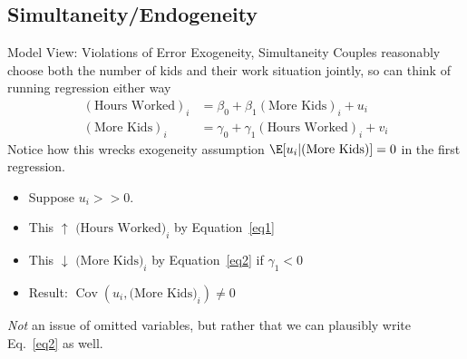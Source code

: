 \documentclass[aspectratio=169, handout]{beamer}
\newcommand{\Cov}{\operatorname{Cov}}
\begin{document}
\subsection{Simultaneity/Endogeneity}

\begin{frame}{Model View: Violations of Error Exogeneity, Simultaneity}
Couples reasonably choose both the number of kids and their work
situation \alert{jointly}, so can think of running regression either way
\begin{align}
  (\text{Hours Worked})_i
  &=
  \beta_0
  +
  \beta_1
  (\text{More Kids})_i
  +
  u_i
  \label{eq1}
  \\
  (\text{More Kids})_i
  &=
  \gamma_0
  +
  \gamma_1
  (\text{Hours Worked})_i
  +
  v_i
  \label{eq2}
\end{align}
Notice how this wrecks exogeneity assumption
$\E[u_i|(\text{More Kids})]=0$ in the first regression.
\begin{itemize}
  \item Suppose $u_i>>0$.
  \item This $\uparrow$ $\text{(Hours Worked)}_i$ by Equation~\ref{eq1}
  \item This $\downarrow$ $\text{(More Kids)}_i$ by Equation~\ref{eq2}
    if $\gamma_1<0$
  \item \alert{Result}: $\Cov(u_i,\text{(More Kids)}_i)\neq 0$
\end{itemize}
\emph{Not} an issue of omitted variables, but rather that we can
plausibly write Eq.~\ref{eq2} as well.
\end{frame}
\end{document}
